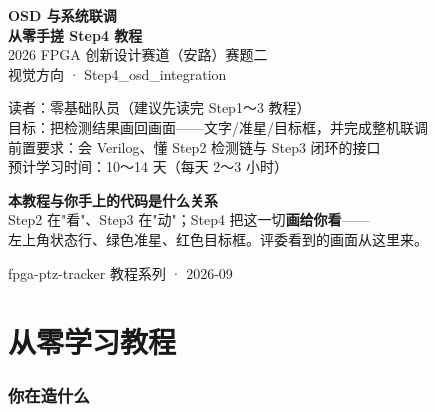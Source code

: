 \documentclass[11pt]{ctexart}
\begin{document}
\begin{titlepage}
\centering
\vspace*{2.2cm}
{\color{deep}\Huge\bfseries OSD 与系统联调}\\[6pt]
{\color{deep}\Large\bfseries 从零手搓 Step4 教程}\\[14pt]
{\large 2026 FPGA 创新设计赛道（安路）赛题二}\\[6pt]
{\large 视觉方向 · Step4\_osd\_integration}\\[20pt]

\begin{tcolorbox}[enhanced, colback=codebg, colframe=accent, boxrule=0.8pt,
  arc=2mm, width=12.5cm, left=4mm, right=4mm, top=3mm, bottom=3mm]
\centering
{\small 读者：零基础队员（建议先读完 Step1～3 教程）\\
目标：把检测结果画回画面——文字/准星/目标框，并完成整机联调\\
前置要求：会 Verilog、懂 Step2 检测链与 Step3 闭环的接口\\
预计学习时间：10～14 天（每天 2～3 小时）}
\end{tcolorbox}

\vspace{8mm}
\begin{tcolorbox}[enhanced, colback=tipbg, colframe=tipline, boxrule=0.5pt,
  arc=2mm, width=12.5cm, left=4mm, right=4mm, top=2mm, bottom=2mm]
\centering
{\small\color{deep} \textbf{本教程与你手上的代码是什么关系}\\
Step2 在"看"、Step3 在"动"；Step4 把这一切\textbf{画给你看}——\\
左上角状态行、绿色准星、红色目标框。评委看到的画面从这里来。}
\end{tcolorbox}

\vfill
{\small\color{black!50} fpga-ptz-tracker 教程系列 · 2026-09}
\end{titlepage}

\tableofcontents
\newpage

\part{从零学习教程}

\section{你在造什么}
\end{document}
